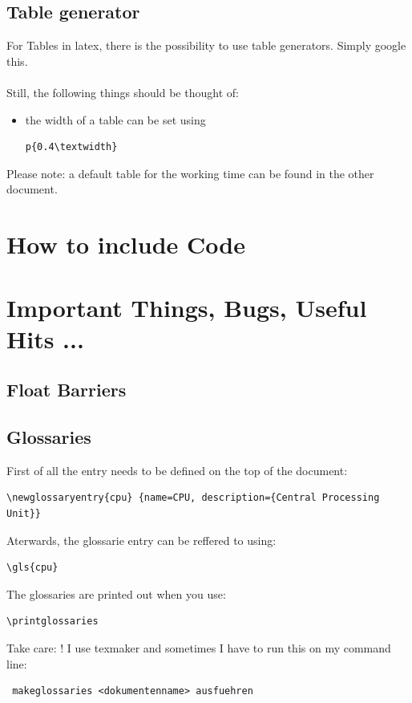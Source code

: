 \documentclass[12pt]{article}
\begin{document}
\subsection{Table generator}
For Tables in latex, there is the possibility to use table generators. Simply google this.
\\ \\
Still, the following things should be thought of:
\\
\begin{itemize}
\item the width of a table can be set using 
\begin{lstlisting}
p{0.4\textwidth}
\end{lstlisting}
\end{itemize}

Please note: a default table for the working time can be found in the other document.


\newpage
\section{How to include Code}

\newpage
\section{Important Things, Bugs, Useful Hits ...}
\subsection{Float Barriers}



\subsection{Glossaries}
First of all the entry needs to be defined on the top of the document:
\begin{lstlisting}
\newglossaryentry{cpu} {name=CPU, description={Central Processing Unit}}
\end{lstlisting}
Aterwards, the glossarie entry can be reffered to using:
\begin{lstlisting}
\gls{cpu}
\end{lstlisting}
The glossaries are printed out when you use: 
\begin{lstlisting}
\printglossaries
\end{lstlisting}
Take care: ! I use texmaker and sometimes I have to run this on my command line:
\begin{lstlisting}
 makeglossaries <dokumentenname> ausfuehren
\end{lstlisting}


\newpage

\listoftables
\listoffigures
\printglossaries
\end{document}
